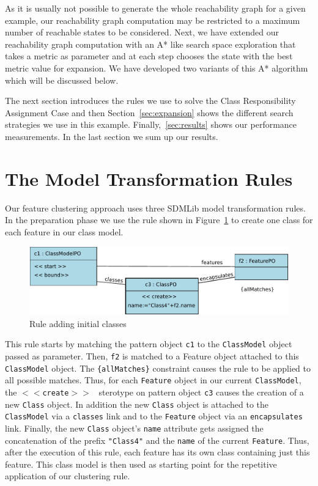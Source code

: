 \documentclass[submission,copyright,creativecommons]{eptcs}
\begin{document}
As it is usually not possible to generate the whole reachability graph for a given example, 
our reachability graph computation may be restricted to a maximum number of reachable 
states to be considered. Next, we have extended our reachability graph computation with an A* 
like search space exploration that takes a metric as parameter and at each step chooses the 
state with the best metric value for expansion. We have developed two variants of this A* 
algorithm which will be discussed below. 

The next section introduces the rules we use to solve the Class Responsibility Assignment Case
and then Section~\ref{sec:expansion} shows the different search strategies we use in this 
example. Finally,~\ref{sec:results} shows our performance measurements. In the last section
we sum up our results. 
 
\section{The Model Transformation Rules}
\label{sec:rules}

Our feature clustering approach uses three SDMLib model transformation rules. In the 
preparation phase we use the rule shown in Figure~\ref{fig:RuleInitialClasses} to create 
one class for each feature in our class model. 

\begin{figure}[ht] \centering
	\includegraphics[width=\linewidth]{images/RuleAddInitialClasses.pdf}
 \caption{Rule adding initial classes}
 \label{fig:RuleInitialClasses}
\end{figure}

This rule starts by matching the pattern object \texttt{c1} to the 
\texttt{ClassModel} object passed as parameter. Then, \texttt{f2} is matched to a 
Feature object attached to this \texttt{ClassModel} object. The 
\texttt{\{allMatches\}} constraint causes the rule to be applied to all possible 
matches. Thus, for each \texttt{Feature} object in our current 
\texttt{ClassModel}, the \texttt {$<<$create$>>$ } sterotype on pattern object 
\texttt{c3} causes the creation of a new \texttt{Class} object. In addition 
the new \texttt{Class} object is attached to the \texttt{ClassModel} via a 
\texttt{classes} link and to the \texttt{Feature} object via an 
\texttt{encapsulates} link. Finally, the new \texttt{Class} object's \texttt{name} 
attribute gets assigned the concatenation of the prefix \texttt{"Class4"} 
and the \texttt{name} of the current \texttt{Feature}. Thus, after the 
execution of this rule, each feature has its own class containing just this 
feature. This class model is then used as starting point for the repetitive 
application of our clustering rule. 
\end{document}
